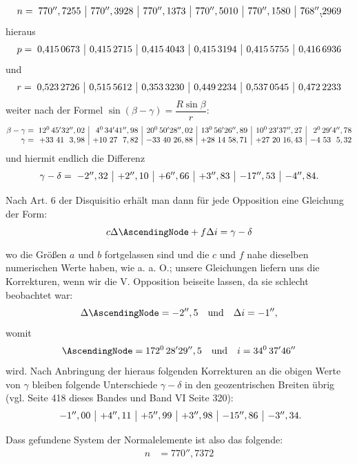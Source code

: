 \begin{landscape}
\[\begin{array}{@{}r@{\;}r|r|r|r|r|r@{}}
n={}&770'',7255 & 770'',3928 & 770'',1373 & 770'',5010 & 770'',1580 & 768''\IIIfourLowComma2969
\end{array}\]
hieraus
\[\begin{array}{@{}r@{\;}r|r|r|r|r|r@{}}
p={}&0{,}415\,0673 & 0{,}415\,2715 & 0{,}415\,4043 & 0{,}415\,3194 & 0{,}415\,5755 & 0{,}416\,6936
\end{array}\]
und
\[\begin{array}{@{}r@{\;}r|r|r|r|r|r@{}}
r={}&0{,}523\,2726 & 0{,}515\,5612 & 0{,}353\,3230 & 0{,}449\,2234 & 0{,}537\,0545 & 0{,}472\,2233
\end{array}\]
weiter nach der Formel \(\sin(\beta-\gamma) = \dfrac{R\sin\beta}{r}\):
\[\begin{array}{@{}r@{\;}r|r|r|r|r|r@{}}
\beta-\gamma={}&12^{0}\,45'32'',02 & 4^{0}\,34'41'',98 & 20^{0}\,50'28'',02 & 13^{0}\,56'26'',89 & 10^{0}\,23'37'',27 & 2^{0}\,29'4'',78
\\
\gamma={}&+33\ 41\ \ 3,98 & +10\ 27\ \ 7,82 & -33\ 40\ 26,88 & +28\ 14\ 58,71 & +27\ 20\ 16,43 & -4\ 53\ \ 5,32
\end{array}\]
und hiermit endlich die Differenz
\[\begin{array}{@{}r@{\;}r|r|r|r|r|r@{}}
\gamma-\delta={}&-2'',32 & +2'',10 & +6'',66 & +3'',83 & -17'',53 & -4'',84.
\end{array}\]
\par
Nach Art. 6 der Disquisitio erhält man dann für jede Opposition eine Gleichung der Form:
\[ \IIIfourLowC\Delta\AscendingNode + f\Delta i = \gamma-\delta \]
wo die Größen \(a\) und \(b\) fortgelassen sind und die \(c\) und \(f\) nahe dieselben numerischen Werte haben, wie a. a. O.; unsere Gleichungen liefern uns die Korrekturen, wenn wir die V. Opposition beiseite lassen, da sie schlecht beobachtet war:
\[ \Delta\AscendingNode = -2'',5 \quad\text{und}\quad \Delta i = -1'', \]
womit
\[ \AscendingNode = 172^{0}\,28'29'',5 \quad\text{und}\quad i = 34^{0}\,37'46'' \]
wird. Nach Anbringung der hieraus folgenden Korrekturen an die obigen Werte von \(\gamma\) bleiben folgende Unterschiede \(\gamma-\delta\) in den geozentrischen Breiten übrig (vgl. Seite 418 dieses Bandes und Band VI Seite 320):
\[\begin{array}{@{}r@{\;}r|r|r|r|r|r@{}}
&-1'',00 & +4'',11 & +5'',99 & +3'',98 & -15'',86 & -3'',34.
\end{array}\]
\par
Dass gefundene System der Normalelemente ist also das folgende:
\[\begin{aligned}
n&=770'',7372\\

\end{aligned}\]
\end{landscape}
